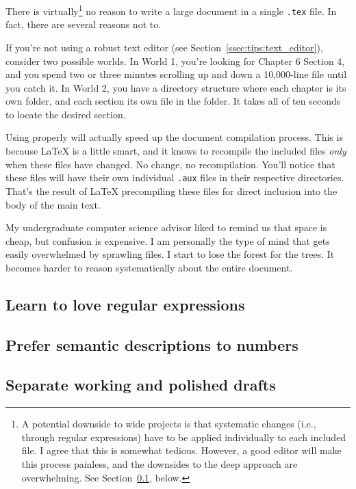 \documentclass{article}
\begin{document}
There is virtually\footnote{A potential downside to wide projects is that systematic changes (i.e., through regular expressions) have to be applied individually to each included file. I agree that this is somewhat tedious. However, a good editor will make this process painless, and the downsides to the deep approach are overwhelming. See Section~\ref{ssec:tips:regex}, below.} no reason to write a large document in a single \texttt{.tex} file. In fact, there are several reasons not to.

If you're not using a robust text editor (see Section~\ref{ssec:tips:text_editor}), consider two possible worlds. In World 1, you're looking for Chapter 6 Section 4, and you spend two or three minutes scrolling up and down a 10,000-line file until you catch it. In World 2, you have a directory structure where each chapter is its own folder, and each section its own file in the folder. It takes all of ten seconds to locate the desired section.

Using \verb|| properly will actually speed up the document compilation process. This is because \LaTeX{} is a little smart, and it knows to recompile the included files \emph{only} when these files have changed. No change, no recompilation. You'll notice that these files will have their own individual \texttt{.aux} files in their respective directories. That's the result of \LaTeX{} precompiling these files for direct inclusion into the body of the main text.

My undergraduate computer science advisor liked to remind us that space is cheap, but confusion is expensive. I am personally the type of mind that gets easily overwhelmed by sprawling files. I start to lose the forest for the trees. It becomes harder to reason systematically about the entire document.

\subsection{Learn to love regular expressions} \label{ssec:tips:regex}

\subsection{Prefer semantic descriptions to numbers} \label{ssec:tips:semantic_descriptions}

\subsection{Separate working and polished drafts} \label{ssec:tips:drafts}
\end{document}
